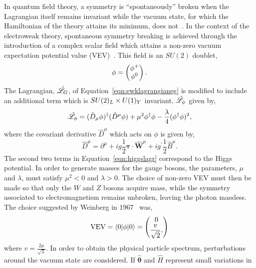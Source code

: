 In quantum field theory, a symmetry is ``spontaneously'' broken when the Lagrangian
itself remains invariant while the vacuum state, for which the Hamiltonian of the theory
attains its minimum, does not~\cite{aitchison}. In the context of the electroweak theory, 
spontaneous symmetry breaking is
achieved through the introduction of a complex scalar field which attains a non-zero 
vacuum expectation potential value (VEV)~\citep{Higgs:1964ia,PhysRev.155.1554}. 
This field is an $SU(2)$ doublet,
\begin{equation}
\phi = 
\everymath{\displaystyle} \begin{pmatrix}
\phi^{+} \\ 
\phi^{0}
\end{pmatrix}.
\end{equation}
The Lagrangian, $\hat{\mathscr{L}}_{G}$, of Equation~\ref{eqn:ewklagrangianeg} is modified to include
an additional term which is $SU(2)_{L}\times U(1)_{Y}$ invariant, $\hat{\mathscr{L}}_{\phi}$
given by, 
\begin{equation}
\hat{\mathscr{L}}_{\phi}=(\hat{D}_{\mu}\phi)^{\dagger}(\hat{D}^{\mu}\phi)  
	    +\mu^{2} \phi^{\dagger}\phi - \frac{\lambda}{4}(\phi^{\dagger}\phi)^{2},
\label{eqn:higgslagr}
\end{equation}
where the covariant derivative $\hat{D}^{\mu}$ which acts on $\phi$ is given by,
\begin{equation}
\hat{D}^{\mu} = \partial^{\mu} + ig\frac{1}{2}\boldsymbol{\tau}\cdot\hat{\mathbf{W}}^{\mu}
		+ ig^{\prime}\frac{1}{2} \hat{B}^{\mu}.
\end{equation}
The second two terms in Equation~\ref{eqn:higgslagr} correspond to the Higgs potential. 
In order to generate masses for the gauge bosons, the parameters, $\mu$ and $\lambda$,
must satisfy $\mu^{2}<0$ and $\lambda>0$. The choice of non-zero 
VEV must then be made so that only the $W$ and $Z$ bosons acquire mass, while the 
symmetry associated to electromagnetism remains unbroken, leaving the photon massless.
The choice suggested by Weinberg in 1967~\citep{weinberg} was,
\begin{equation}
\mathrm{VEV} = \langle0|\phi|0\rangle = 
\everymath{\displaystyle} \begin{pmatrix}
0 \\ 
\frac{v}{\sqrt{2}},
\end{pmatrix}
\end{equation}
where $v= \frac{\displaystyle 2\mu}{\displaystyle \sqrt{\lambda}}$. In order to 
obtain the physical particle spectrum, perturbations around the vacuum state
are considered. If $\boldsymbol{\hat{\theta}}$ and $\hat{H}$ represent small variations in 
